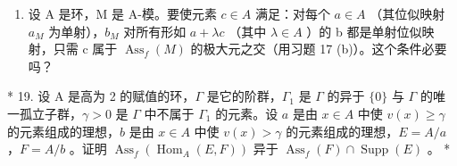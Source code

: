 \begin{enumerate}
\def\labelenumi{\arabic{enumi}.}
\setcounter{enumi}{17}
\tightlist
\item
  设 A 是环，M 是 A-模。要使元素 \(c \in A\) 满足：对每个 \(a \in A\) （其位似映射 \(a_{M}\) 为单射），\(b_{M}\) 对所有形如 \(a + \lambda c\) （其中 \(\lambda \in A\) ）的 b 都是单射位似映射，只需 c 属于 \(\operatorname{Ass}_{f}(M)\) 的极大元之交（用习题 17 (b)）。这个条件必要吗？
\end{enumerate}

* 19. 设 A 是高为 2 的赋值的环，\(\Gamma\) 是它的阶群，\(\Gamma_1\) 是 \(\Gamma\) 的异于 \(\{0\}\) 与 \(\Gamma\) 的唯一孤立子群，\(\gamma > 0\) 是 \(\Gamma\) 中不属于 \(\Gamma_1\) 的元素。设 \(a\) 是由 \(x \in A\) 中使 \(v(x) \geqslant \gamma\) 的元素组成的理想，\(b\) 是由 \(x \in A\) 中使 \(v(x) > \gamma\) 的元素组成的理想，\(E = A/a\) ，\(F = A/b\) 。证明 \(\operatorname{Ass}_f(\operatorname{Hom}_A(E, F))\) 异于 \(\operatorname{Ass}_f(F) \cap \operatorname{Supp}(E)\) 。 *

